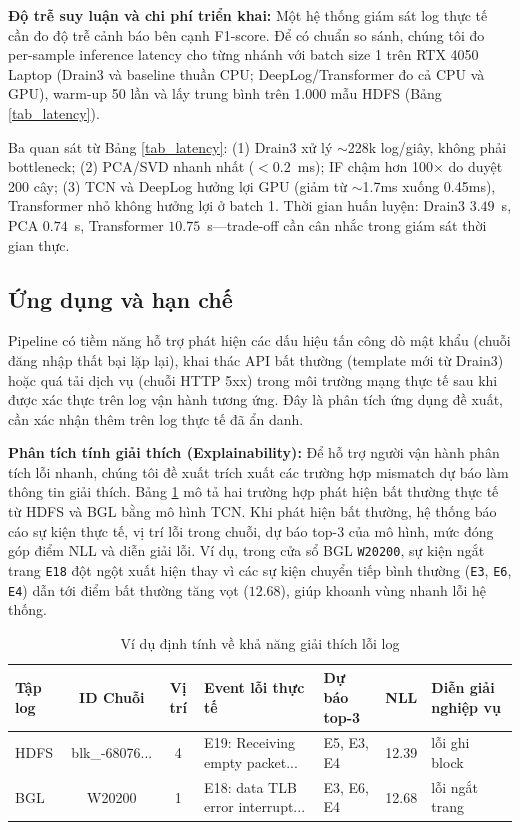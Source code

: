 \documentclass[conference]{IEEEtran}
\begin{document}
\textbf{Độ trễ suy luận và chi phí triển khai:} Một hệ thống giám sát log thực tế cần đo độ trễ cảnh báo bên cạnh F1-score. Để có chuẩn so sánh, chúng tôi đo per-sample inference latency cho từng nhánh với batch size 1 trên RTX 4050 Laptop (Drain3 và baseline thuần CPU; DeepLog/Transformer đo cả CPU và GPU), warm-up 50 lần và lấy trung bình trên 1.000 mẫu HDFS (Bảng \ref{tab_latency}).

Ba quan sát từ Bảng \ref{tab_latency}: (1) Drain3 xử lý $\sim$228k log/giây, không phải bottleneck; (2) PCA/SVD nhanh nhất ($<0.2$~ms); IF chậm hơn 100× do duyệt 200 cây; (3) TCN và DeepLog hưởng lợi GPU (giảm từ $\sim$1.7ms xuống 0.45ms), Transformer nhỏ không hưởng lợi ở batch 1. Thời gian huấn luyện: Drain3 $3.49$~s, PCA $0.74$~s, Transformer $10.75$~s---trade-off cần cân nhắc trong giám sát thời gian thực.


\subsection{Ứng dụng và hạn chế}
Pipeline có tiềm năng hỗ trợ phát hiện các dấu hiệu tấn công dò mật khẩu (chuỗi đăng nhập thất bại lặp lại), khai thác API bất thường (template mới từ Drain3) hoặc quá tải dịch vụ (chuỗi HTTP 5xx) trong môi trường mạng thực tế sau khi được xác thực trên log vận hành tương ứng. Đây là phân tích ứng dụng đề xuất, cần xác nhận thêm trên log thực tế đã ẩn danh.

\textbf{Phân tích tính giải thích (Explainability):} Để hỗ trợ người vận hành phân tích lỗi nhanh, chúng tôi đề xuất trích xuất các trường hợp mismatch dự báo làm thông tin giải thích. Bảng \ref{tab_explainability} mô tả hai trường hợp phát hiện bất thường thực tế từ HDFS và BGL bằng mô hình TCN. Khi phát hiện bất thường, hệ thống báo cáo sự kiện thực tế, vị trí lỗi trong chuỗi, dự báo top-3 của mô hình, mức đóng góp điểm NLL và diễn giải lỗi. Ví dụ, trong cửa sổ BGL \texttt{W20200}, sự kiện ngắt trang \texttt{E18} đột ngột xuất hiện thay vì các sự kiện chuyển tiếp bình thường (\texttt{E3}, \texttt{E6}, \texttt{E4}) dẫn tới điểm bất thường tăng vọt ($12.68$), giúp khoanh vùng nhanh lỗi hệ thống.

\begin{table}[htbp]
\caption{Ví dụ định tính về khả năng giải thích lỗi log}
\begin{center}
\scriptsize
\setlength{\tabcolsep}{2pt}
\begin{tabular}{lccp{2.3cm}p{1.1cm}cp{1.3cm}}
\toprule
\textbf{Tập log} & \textbf{ID Chuỗi} & \textbf{Vị trí} & \textbf{Event lỗi thực tế} & \textbf{Dự báo top-3} & \textbf{NLL} & \textbf{Diễn giải nghiệp vụ} \\
\midrule
HDFS & blk\_-68076... & 4 & E19: Receiving empty packet... & E5, E3, E4 & 12.39 & lỗi ghi block \\
BGL & W20200 & 1 & E18: data TLB error interrupt... & E3, E6, E4 & 12.68 & lỗi ngắt trang \\
\bottomrule
\end{tabular}
\label{tab_explainability}
\end{center}
\end{table}
\end{document}
